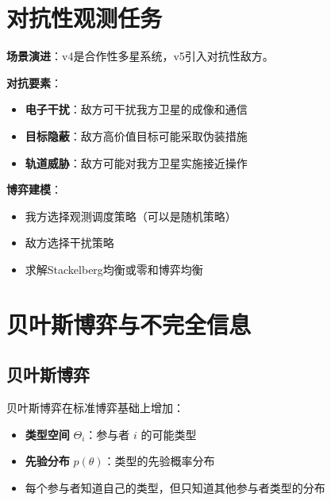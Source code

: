 \section{对抗性观测任务}

\begin{caseboxA}
\textbf{场景演进}：v4是合作性多星系统，v5引入对抗性敌方。

\textbf{对抗要素}：
\begin{itemize}
  \item \textbf{电子干扰}：敌方可干扰我方卫星的成像和通信
  \item \textbf{目标隐蔽}：敌方高价值目标可能采取伪装措施
  \item \textbf{轨道威胁}：敌方可能对我方卫星实施接近操作
\end{itemize}

\textbf{博弈建模}：
\begin{itemize}
  \item 我方选择观测调度策略（可以是随机策略）
  \item 敌方选择干扰策略
  \item 求解Stackelberg均衡或零和博弈均衡
\end{itemize}
\end{caseboxA}

\section{贝叶斯博弈与不完全信息}

\subsection{贝叶斯博弈}

\begin{definition}[贝叶斯博弈]
贝叶斯博弈在标准博弈基础上增加：
\begin{itemize}
  \item \textbf{类型空间} $\Theta_i$：参与者 $i$ 的可能类型
  \item \textbf{先验分布} $p(\theta)$：类型的先验概率分布
  \item 每个参与者知道自己的类型，但只知道其他参与者类型的分布
\end{itemize}
\end{definition}

